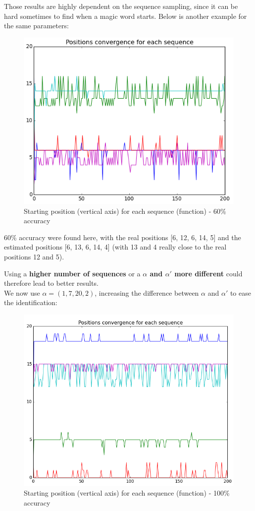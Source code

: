 Those results are highly dependent on the sequence sampling, since it can be hard sometimes to find when a magic word starts. Below is another example for the same parameters:

\begin{figure}[H]
\centering
\includegraphics[width=0.7\linewidth]{img/e.png}
\caption{Starting position (vertical axis) for each sequence (function) - 60\% accuracy}
\end{figure}

60\% accuracy were found here, with the real positions [6, 12, 6, 14, 5] and the estimated positions [6, 13, 6, 14, 4] (with 13 and 4 really close to the real positions 12 and 5).

Using a \textbf{higher number of sequences} or a \textbf{$\alpha$ and $\alpha'$ more different} could therefore lead to better results.
\\


We now use \textbf{$\alpha = (1,7,20,2)$}, increasing the difference between $\alpha$ and $\alpha'$ to ease the identification:

\begin{figure}[H]
\centering
\includegraphics[width=0.7\linewidth]{img/b.png}
\caption{Starting position (vertical axis) for each sequence (function) - 100\% accuracy}
\end{figure}


